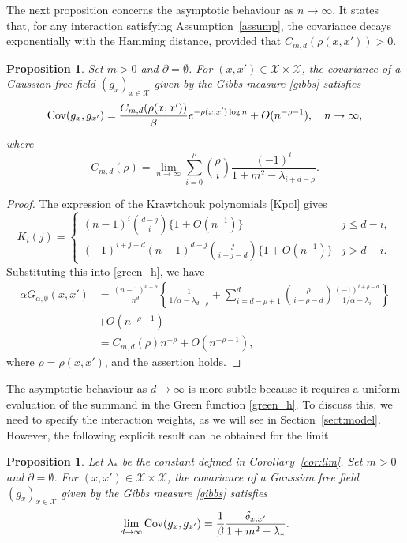 \documentclass[a4paper,11pt]{article}
\theoremstyle{plain}
\newtheorem{proposition}[theorem]{Proposition}
\theoremstyle{definition}
\begin{document}
The next proposition concerns the asymptotic behaviour
as $n\to\infty$. It states that, for any interaction
satisfying Assumption~\ref{assump}, the covariance
decays exponentially with the Hamming distance,
provided that $C_{m,d}(\rho(x,x'))>0$.

\begin{proposition}\label{pro:limcov}
  Set $m>0$ and $\partial=\emptyset$. For
  $(x,x')\in\mathcal{X}\times\mathcal{X}$,
  the covariance of a Gaussian free field
  $(g_x)_{x\in\mathcal{X}}$ given by the Gibbs measure
  \eqref{gibbs} satisfies
  \begin{equation}\label{pro:limcov:1}
    {\rm Cov}(g_x,g_{x'})
    =\frac{C_{m,d}(\rho(x,x'))}{\beta}
     e^{-{\rho(x,x')\log n}}
        +O(n^{-\rho-1}), \quad n\to\infty,
  \end{equation}
  where
  \[
    C_{m,d}(\rho)=\lim_{n\to\infty}
    \sum_{i=0}^\rho
    \binom{\rho}{i}\frac{(-1)^i}{1+m^2-\lambda_{i+d-\rho}}.
  \]
\end{proposition}

\begin{proof}
  The expression of the Krawtchouk polynomials
  \eqref{Kpol} gives
  \[
  K_i(j)=\left\{
  \begin{array}{ll}
      (n-1)^i\binom{d-j}{i}\{1+O(n^{-1})\} & j\le d-i,\\
      (-1)^{i+j-d}(n-1)^{d-j}\binom{j}{i+j-d}
      \{1+O(n^{-1})\} & j>d-i. 
   \end{array} \right.  
  \]
  Substituting this into \eqref{green_h}, we have
  \begin{align*}
    \alpha G_{\alpha,\emptyset}(x,x')&=
    \frac{(n-1)^{d-\rho}}{n^d}\left\{
    \frac{1}{1/\alpha-\lambda_{d-\rho}}
    +\sum_{i=d-\rho+1}^d
    \binom{\rho}{i+\rho-d}
    \frac{(-1)^{i+\rho-d}}
         {1/\alpha-\lambda_i}\right\}\\
    &     +O(n^{-\rho-1})\\
    &=C_{m,d}(\rho)n^{-\rho}+O(n^{-\rho-1}),
  \end{align*}
  where $\rho=\rho(x,x')$, and the assertion
  holds.
\end{proof}

The asymptotic behaviour as $d\to\infty$ is more subtle
because it requires a uniform evaluation of the summand
in the Green function \eqref{green_h}. To discuss this,
we need to specify the interaction weights, as we will
see in Section~\ref{sect:model}. However, the following
explicit result can be obtained for the limit.
  
\begin{proposition}\label{pro:limcovd}
  Let $\lambda_*$ be the constant defined in Corollary~\ref{cor:lim}.
  Set $m>0$ and $\partial=\emptyset$.
  For $(x,x')\in\mathcal{X}\times\mathcal{X}$, the covariance
  of a Gaussian free field $(g_x)_{x\in\mathcal{X}}$ given
  by the Gibbs measure \eqref{gibbs} satisfies
  \begin{equation*}
    \lim_{d\to\infty}{\rm Cov}(g_x,g_{x'})=\frac{1}{\beta}
    \frac{\delta_{x,x'}}{1+m^2-\lambda_*}.
  \end{equation*}
\end{proposition}
\end{document}
